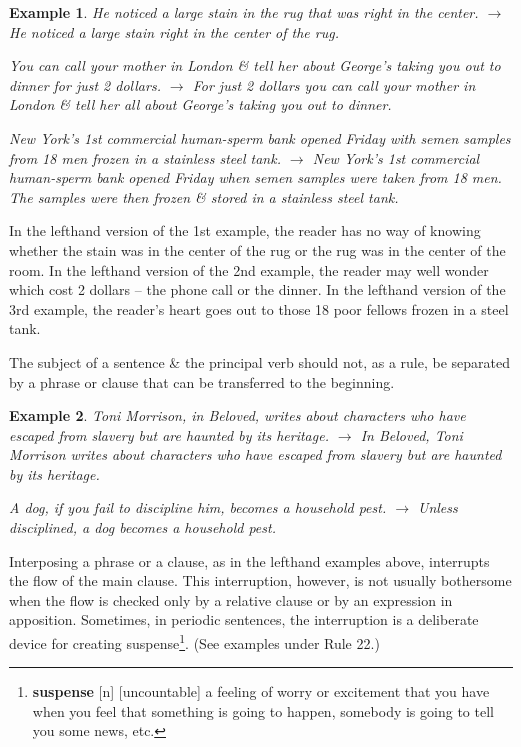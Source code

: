 \documentclass[oneside]{book}
\numberwithin{equation}{section}
\newtheorem{example}{Example}[chapter]
\begin{document}
\begin{example}
	He noticed a large stain in the rug that was right in the center. $\to$ He noticed a large stain right in the center of the rug.
	
	You can call your mother in London \& tell her about George's taking you out to dinner for just 2 dollars. $\to$ For just 2 dollars you can call your mother in London \& tell her all about George's taking you out to dinner.
	
	New York's 1st commercial human-sperm bank opened Friday with semen samples from 18 men frozen in a stainless steel tank. $\to$ New York's 1st commercial human-sperm bank opened Friday when semen samples were taken from 18 men. The samples were then frozen \& stored in a stainless steel tank.
\end{example}
In the lefthand version of the 1st example, the reader has no way of knowing whether the stain was in the center of the rug or the rug was in the center of the room. In the lefthand version of the 2nd example, the reader may well wonder which cost 2 dollars -- the phone call or the dinner. In the lefthand version of the 3rd example, the reader's heart goes out to those 18 poor fellows frozen in a steel tank.

The subject of a sentence \& the principal verb should not, as a rule, be separated by a phrase or clause that can be transferred to the beginning.

\begin{example}
	Toni Morrison, in \emph{Beloved}, writes about characters who have escaped from slavery but are haunted by its heritage. $\to$ In \emph{Beloved}, Toni Morrison writes about characters who have escaped from slavery but are haunted by its heritage.
	
	A dog, if you fail to discipline him, becomes a household pest. $\to$ Unless disciplined, a dog becomes a household pest.
\end{example}
Interposing a phrase or a clause, as in the lefthand examples above, interrupts the flow of the main clause. This interruption, however, is not usually bothersome when the flow is checked only by a relative clause or by an expression in apposition. Sometimes, in periodic sentences, the interruption is a deliberate device for creating suspense\footnote{\textbf{suspense} [n] [uncountable] a feeling of worry or excitement that you have when you feel that something is going to happen, somebody is going to tell you some news, etc.}. (See examples under Rule 22.)
\end{document}
